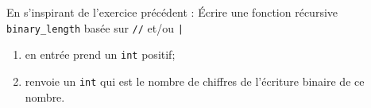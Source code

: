 \documentclass[a4paper,12pt,french]{book}
\begin{document}

\begin{exercice}[]
	En s'inspirant de l'exercice précédent :
	\'Ecrire une fonction récursive \texttt{binary_length}  basée sur \texttt{//} et/ou \texttt|%
	\begin{enumerate}[--]
		\item 	en entrée prend un \texttt{int} positif;
		\item 	renvoie un \texttt{int} qui est le nombre de chiffres de l'écriture binaire de ce nombre.
	\end{enumerate}
\end{exercice}
\end{document}
